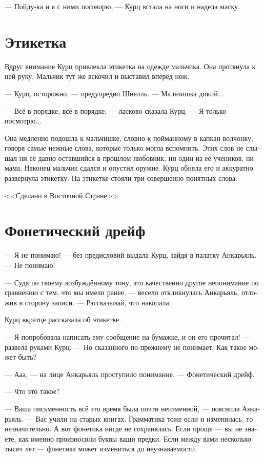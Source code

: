 \documentclass[a4paper,10pt,fleqn]{book}\usepackage{polyglossia}\setdefaultlanguage[babelshorthands=true]{russian}\setotherlanguage{english}\defaultfontfeatures{Ligatures=TeX,Mapping=tex-text}\usepackage{xcolor}\newcommand{\ml}[3]{#2}
\begin{document}
--- Пойду-ка и я с ними поговорю, --- Курц встала на ноги и надела маску.

\section{Этикетка}

Вдруг внимание Курц привлекла этикетка на одежде мальчика.
Она протянула к ней руку.
Мальчик тут же вскочил и выставил вперёд нож.

--- Курц, осторожно, --- предупредил Шнелль.
--- Мальчишка дикий...

--- Всё в порядке, всё в порядке, --- ласково сказала Курц.
--- Я только посмотрю...

Она медленно подошла к мальчишке, словно к пойманному в капкан волчонку, говоря самые нежные слова, которые только могла вспомнить.
Этих слов не слышал ни её давно оставшийся в прошлом любовник, ни один из её учеников, ни мама.
Наконец мальчик сдался и опустил оружие.
Курц обняла его и аккуратно развернула этикетку.
На этикетке стояли три совершенно понятных слова:

\ml{$0$}
{<<Сделано в Восточной Стране>>}
{\textsc{Made in Eastern Realm}}

\section{Фонетический дрейф}

--- Я не понимаю! --- без предисловий выдала Курц, зайдя в палатку Анкарьяль.
--- Не понимаю!

--- Судя по твоему возбуждённому тону, это качественно другое непонимание по сравнению с тем, что мы имели ранее, --- весело откликнулась Анкарьяль, отложив в сторону записи.
--- Рассказывай, что накопала.

Курц вкратце рассказала об этикетке.

--- Я попробовала написать ему сообщение на бумажке, и он его прочитал! --- развела руками Курц.
--- Но сказанного по-прежнему не понимает.
Как такое может быть?

--- Ааа, --- на лице Анкарьяль проступило понимание.
--- Фонетический дрейф.

--- Что это такое?

--- Ваша письменность всё это время была почти неизменной, --- пояснила Анкарьяль.
--- Вас учили на старых книгах.
Грамматика тоже если и изменилась, то незначительно.
А вот фонетика нигде не сохранялась.
Если проще --- вы не знаете, как именно произносили буквы ваши предки.
Если между вами несколько тысяч лет --- фонетика может измениться до неузнаваемости.
\end{document}
